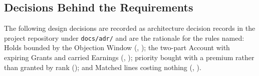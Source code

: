 \subsection{Decisions Behind the Requirements}

The following design decisions are recorded as architecture decision records in the project repository under \texttt{docs/adr/} and are the rationale for the rules named: Holds bounded by the Objection Window (, ); the two-part Account with expiring Grants and carried Earnings (, ); priority bought with a premium rather than granted by rank (); and Matched lines costing nothing (, ).
